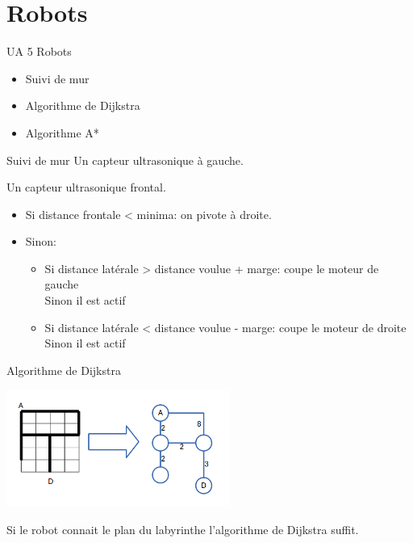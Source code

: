 \documentclass{beamer}
\begin{document}
\section{Robots}
  \begin{frame}{UA 5 Robots}
      \begin{itemize}
          \item Suivi de mur
          \item Algorithme de Dijkstra
          \item Algorithme A*
      \end{itemize}
  \end{frame}
  \begin{frame}{Suivi de mur}
    Un capteur ultrasonique à gauche.

    Un capteur ultrasonique frontal.

    \begin{itemize}
      \item Si distance frontale < minima: on pivote à droite.
      \item Sinon:
      \begin{itemize}
        \item Si distance latérale > distance voulue + marge: coupe le moteur
        de gauche \\Sinon il est actif \item Si distance latérale < distance
          voulue - marge: coupe le moteur de droite \\Sinon il est actif
      \end{itemize}
    \end{itemize}
  \end{frame}

  \begin{frame}{Algorithme de Dijkstra}
    \begin{center}
      \includegraphics[width=0.55\textwidth]{jeux/GRO_graph1} \\
    \end{center}
    Si le robot connait le plan du labyrinthe l'algorithme de Dijkstra suffit. 
  \end{frame}
\end{document}
